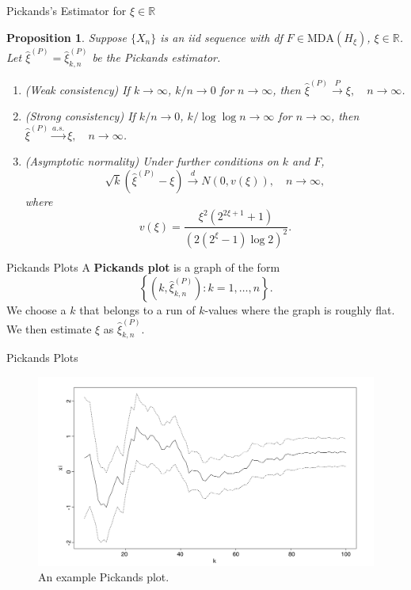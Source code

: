 \documentclass{beamer}
\newcommand{\MDA}{\text{MDA}}
\newtheorem{proposition}{Proposition}
\begin{document}
\begin{frame}{Pickands's Estimator for $\xi \in \mathbb{R}$}
    \begin{proposition}
        Suppose $\{X_n\}$ is an iid sequence with df $F \in \MDA(H_{\xi})$, $\xi \in \mathbb{R}$. Let $\hat{\xi}^{(P)} = \hat{\xi}_{k, n}^{(P)}$ be the Pickands estimator.
        \begin{enumerate}
            \item[(a)] (Weak consistency) If $k \to \infty$, $k / n \to 0$ for $n \to \infty$, then $\hat{\xi}^{(P)} \xrightarrow{P} \xi, \quad n \to \infty$.
            \item[(b)] (Strong consistency) If $k / n \to 0$, $k / \log\log n \to \infty$ for $n \to \infty$, then 
            $\hat{\xi}^{(P)} \xrightarrow{a.s.} \xi, \quad n \to \infty$.
            \item[(c)] (Asymptotic normality) Under further conditions on $k$ and $F$,
            \[
            \sqrt{k}(\hat{\xi}^{(P)} - \xi) \xrightarrow{d} N(0, v(\xi)), \quad n \to \infty,
            \]
            where
            \[
            v(\xi) = \frac{\xi^2(2^{2\xi + 1} + 1)}{(2(2^{\xi} - 1)\log 2)^2}.
            \]
        \end{enumerate}
    \end{proposition}    
\end{frame}

\begin{frame}{Pickands Plots}
    A \textbf{Pickands plot} is a graph of the form
    \[
    \left\{\left(k, \hat{\xi}_{k, n}^{(P)}\right) : k = 1, \ldots, n\right\}.
    \]
    We choose a $k$ that belongs to a run of $k$-values where the graph is roughly flat. We then estimate $\xi$ as $\hat{\xi}_{k, n}^{(P)}$.
\end{frame}

\begin{frame}{Pickands Plots}
    \begin{figure}
        \centering
        \includegraphics[scale=0.35]{pickands_plot.png}
        \caption{An example Pickands plot.}
        \label{fig:pickands_plot}
    \end{figure}
\end{frame}
\end{document}
